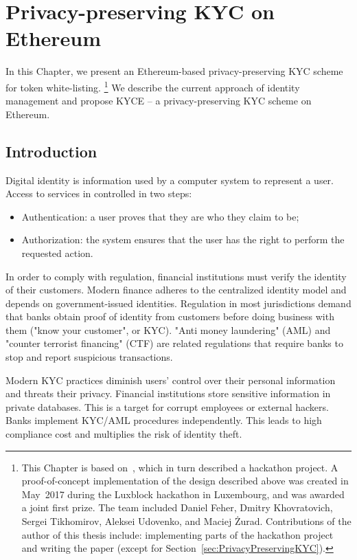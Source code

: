 \chapter{Privacy-preserving KYC on Ethereum}

\label{Chapter12KYC}

In this Chapter, we present an Ethereum-based privacy-preserving KYC scheme for token white-listing.
\footnote{This Chapter is based on~\cite{Biryukov2018}, which in turn described a hackathon project. A proof-of-concept implementation of the design described above was created in May~2017 during the Luxblock hackathon in Luxembourg, and was awarded a joint first prize. The team included Daniel Feher, Dmitry Khovratovich, Sergei Tikhomirov, Aleksei Udovenko, and Maciej \.{Z}urad. Contributions of the author of this thesis include: implementing parts of the hackathon project and writing the paper (except for Section~\ref{sec:PrivacyPreservingKYC}).}
We describe the current approach of identity management and propose KYCE -- a privacy-preserving KYC scheme on Ethereum.



\section{Introduction}

Digital identity is information used by a computer system to represent a user.
Access to services in controlled in two steps:

\begin{itemize}
	\item Authentication: a user proves that they are who they claim to be;
	\item Authorization: the system ensures that the user has the right to perform the requested action.
\end{itemize}

In order to comply with regulation, financial institutions must verify the identity of their customers.
Modern finance adheres to the centralized identity model and depends on government-issued identities.
Regulation in most jurisdictions demand that banks obtain proof of identity from customers before doing business with them ("know your customer", or KYC).
"Anti money laundering" (AML) and "counter terrorist financing" (CTF) are related regulations that require banks to stop and report suspicious transactions.

Modern KYC practices diminish users' control over their personal information and threats their privacy.
Financial institutions store sensitive information in private databases.
This is a target for corrupt employees or external hackers.
Banks implement KYC/AML procedures independently.
This leads to high compliance cost and multiplies the risk of identity theft.

